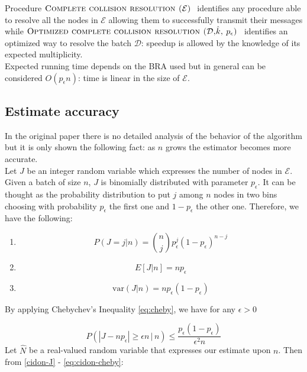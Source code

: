 \documentclass[12pt,a4paper]{report}
\newcommand{\pc}{p_{\epsilon}}
\newcommand{\algname}[1]{\ensuremath{\mbox{\sc #1}}}
\begin{document}
 Procedure \algname{Complete collision resolution ($\mathcal{E}$) } identifies any procedure able to resolve all the nodes in $\mathcal{E}$ allowing them to successfully transmit their messages while \algname{Optimized complete collision resolution ($\mathcal{D}$,$\hat{k}$, $\pc$) } identifies an optimized way to resolve the batch $\mathcal{D}$: speedup is allowed by the knowledge of its expected multiplicity.\\
 
 Expected running time depends on the BRA used but in general can be considered $O(\pc n)$: time is linear in the size of $\mathcal{E}$.

\subsection{Estimate accuracy}
\label{cidon-estimate-accuracy}

In the original paper \cite{cidon} there is no detailed analysis of the behavior of the algorithm but it is only shown the following fact: as $n$ grows the estimator becomes more accurate.\\
    
Let $J$ be an integer random variable which expresses the number of nodes in $\mathcal{E}$. Given a batch of size $n$, $J$ is binomially distributed with parameter $\pc$. It can be thought as the probability distribution to put $j$ among  $n$ nodes in two bins choosing with probability $\pc$ the first one and $1-\pc$ the other one.  Therefore, we have the following:

\begin{enumerate}[1)]
\item \begin{equation}P(J=j|n)={n \choose j}\pc^{j}(1-\pc)^{n-j}
           \label{cidon-J}\end{equation}
\item \begin{equation}E[J|n]=n\pc\label{cidon-e-estimate}\end{equation}
\item \begin{equation}\textrm{var}(J|n)=n\pc(1-\pc)\end{equation}
\end{enumerate}

By applying Chebychev's Inequality \eqref{eq:cheby},  we have for any $\epsilon>0$
 
 \begin{equation}
P\left( \left| J-n\pc\right| \geq \epsilon n \,|\, n \right) \leq \frac{\pc(1-\pc)}{\epsilon^{2}n}
\label{eq:cidon-cheby}
 \end{equation}
 Let $\hat{N}$ be a real-valued random variable that expresses our estimate upon $n$. Then from \eqref{cidon-J} - \eqref{eq:cidon-cheby}:
\end{document}
